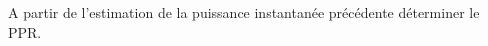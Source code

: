 \question{} A partir de l'estimation de la puissance instantanée précédente déterminer le PPR.

%
%
%
